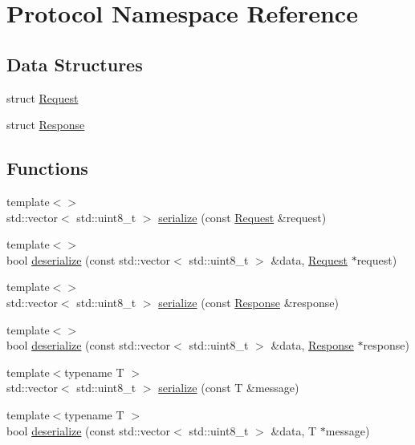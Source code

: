 \hypertarget{namespaceProtocol}{}\section{Protocol Namespace Reference}
\label{namespaceProtocol}
\subsection*{Data Structures}
\begin{DoxyCompactItemize}
\item 
struct \hyperlink{structProtocol_1_1Request}{Request}
\item 
struct \hyperlink{structProtocol_1_1Response}{Response}
\end{DoxyCompactItemize}
\subsection*{Functions}
\begin{DoxyCompactItemize}
\item 
{\footnotesize template$<$$>$ }\\std\+::vector$<$ std\+::uint8\+\_\+t $>$ \hyperlink{namespaceProtocol_a9eadcd3ffc63dc592406a7acd8ad68bc}{serialize} (const \hyperlink{structProtocol_1_1Request}{Request} \&request)
\item 
{\footnotesize template$<$$>$ }\\bool \hyperlink{namespaceProtocol_a8ffab1eaeb22f833bf66d459e0779e8e}{deserialize} (const std\+::vector$<$ std\+::uint8\+\_\+t $>$ \&data, \hyperlink{structProtocol_1_1Request}{Request} $\ast$request)
\item 
{\footnotesize template$<$$>$ }\\std\+::vector$<$ std\+::uint8\+\_\+t $>$ \hyperlink{namespaceProtocol_a235264aa75bf1d2e3c561787c2af2573}{serialize} (const \hyperlink{structProtocol_1_1Response}{Response} \&response)
\item 
{\footnotesize template$<$$>$ }\\bool \hyperlink{namespaceProtocol_a89a2ebe25b5f049e779e4c451712a4d4}{deserialize} (const std\+::vector$<$ std\+::uint8\+\_\+t $>$ \&data, \hyperlink{structProtocol_1_1Response}{Response} $\ast$response)
\item 
{\footnotesize template$<$typename T $>$ }\\std\+::vector$<$ std\+::uint8\+\_\+t $>$ \hyperlink{namespaceProtocol_aed66655af8e41eb84311b69e0f1cbbad}{serialize} (const T \&message)
\item 
{\footnotesize template$<$typename T $>$ }\\bool \hyperlink{namespaceProtocol_affe27ed8631c1368f3076ccd6499fb2f}{deserialize} (const std\+::vector$<$ std\+::uint8\+\_\+t $>$ \&data, T $\ast$message)
\end{DoxyCompactItemize}


